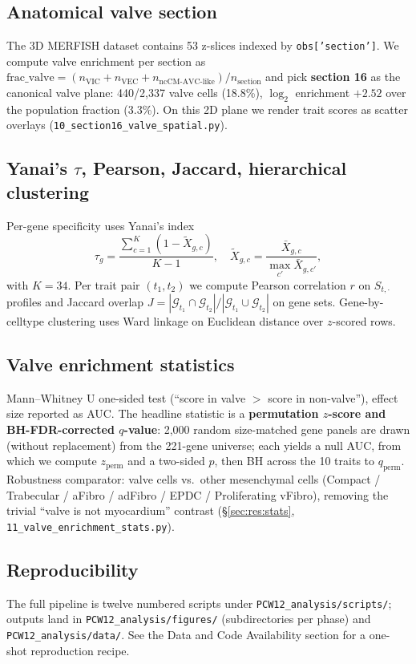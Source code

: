 \documentclass[11pt,a4paper]{article}
\begin{document}
\subsection{Anatomical valve section}
\label{sec:methods:section}
The 3D MERFISH dataset contains 53 z-slices indexed by
\texttt{obs['section']}. We compute valve enrichment per section as
$\mathrm{frac\_valve} = (n_{\text{VIC}} + n_{\text{VEC}} + n_{\text{ncCM-AVC-like}})/n_{\text{section}}$
and pick \textbf{section 16} as the canonical valve plane: 440/2{,}337
valve cells (18.8\%), $\log_2$ enrichment $+2.52$ over the population
fraction (3.3\%). On this 2D plane we render trait scores as scatter
overlays (\texttt{10\_section16\_valve\_spatial.py}).

\subsection{Yanai's $\tau$, Pearson, Jaccard, hierarchical clustering}
\label{sec:methods:tau}
Per-gene specificity uses Yanai's index
\[
\tau_g = \frac{\sum_{c=1}^{K}(1 - \tilde{X}_{g,c})}{K-1},
\quad
\tilde{X}_{g,c} = \frac{\bar{X}_{g,c}}{\max_{c'}\bar{X}_{g,c'}},
\]
with $K=34$. Per trait pair $(t_1, t_2)$ we compute Pearson
correlation $r$ on $S_{t,\cdot}$ profiles and Jaccard overlap
$J = |\mathcal{G}_{t_1} \cap \mathcal{G}_{t_2}|/|\mathcal{G}_{t_1}\cup\mathcal{G}_{t_2}|$
on gene sets. Gene-by-celltype clustering uses Ward linkage on
Euclidean distance over $z$-scored rows.

\subsection{Valve enrichment statistics}
\label{sec:methods:stats}
Mann--Whitney U one-sided test (``score in valve $>$ score in non-valve''),
effect size reported as AUC. The headline statistic is a
\textbf{permutation $z$-score and BH-FDR-corrected $q$-value}: 2{,}000
random size-matched gene panels are drawn (without replacement) from
the 221-gene universe; each yields a null AUC, from which we compute
$z_{\text{perm}}$ and a two-sided $p$, then BH across the 10 traits to
$q_{\text{perm}}$. Robustness comparator: valve cells vs.\ other
mesenchymal cells (Compact / Trabecular / aFibro / adFibro / EPDC /
Proliferating vFibro), removing the trivial ``valve is not myocardium''
contrast (\S\ref{sec:res:stats},
\texttt{11\_valve\_enrichment\_stats.py}).

\subsection{Reproducibility}
The full pipeline is twelve numbered scripts under
\texttt{PCW12\_analysis/scripts/}; outputs land in
\texttt{PCW12\_analysis/figures/} (subdirectories per phase) and
\texttt{PCW12\_analysis/data/}. See the Data and Code Availability
section for a one-shot reproduction recipe.
\end{document}
